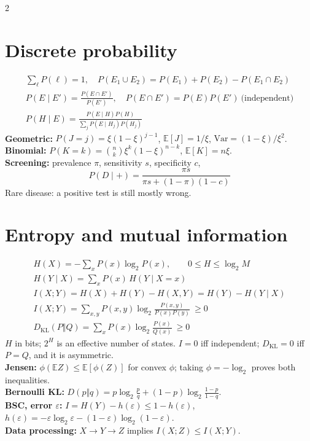 \documentclass[10pt,a4paper]{scrartcl}
\begin{document}
\begin{multicols}{2}
\section*{Discrete probability}
\begin{gather*}
\sum_\ell P(\ell)=1,\quad
P(E_1\cup E_2)=P(E_1)+P(E_2)-P(E_1\cap E_2)\\
P(E\mid E')=\frac{P(E\cap E')}{P(E')},\quad
P(E\cap E')=P(E)P(E')\ \text{(independent)}\\
P(H\mid E)=\frac{P(E\mid H)P(H)}{\sum_jP(E\mid H_j)P(H_j)}
\end{gather*}
\textbf{Geometric:} $P(J=j)=\xi(1-\xi)^{j-1}$, $\mathbb E[J]=1/\xi$, $\mathrm{Var}=(1-\xi)/\xi^2$.\\
\textbf{Binomial:} $P(K=k)=\binom nk\xi^k(1-\xi)^{n-k}$, $\mathbb E[K]=n\xi$.\\
\textbf{Screening:} prevalence $\pi$, sensitivity $s$, specificity $c$,
\begin{equation*}
P(D\mid+)=\frac{\pi s}{\pi s+(1-\pi)(1-c)}
\end{equation*}
Rare disease: a positive test is still mostly wrong.

\section*{Entropy and mutual information}
\begin{gather*}
H(X)=-\sum_xP(x)\log_2P(x),\qquad 0\le H\le\log_2M\\
H(Y\mid X)=\sum_xP(x)\,H(Y\mid X=x)\\
I(X;Y)=H(X)+H(Y)-H(X,Y)=H(Y)-H(Y\mid X)\\
I(X;Y)=\sum_{x,y}P(x,y)\log_2\frac{P(x,y)}{P(x)P(y)}\ \ge0\\
D_{\mathrm{KL}}(P\Vert Q)=\sum_xP(x)\log_2\frac{P(x)}{Q(x)}\ \ge0
\end{gather*}
$H$ in bits; $2^H$ is an effective number of states. $I=0$ iff independent; $D_{\mathrm{KL}}=0$ iff $P=Q$, and it is asymmetric.\\
\textbf{Jensen:} $\phi(\mathbb E Z)\le\mathbb E[\phi(Z)]$ for convex $\phi$; taking $\phi=-\log_2$ proves both inequalities.\\
\textbf{Bernoulli KL:} $D(p\Vert q)=p\log_2\frac pq+(1-p)\log_2\frac{1-p}{1-q}$.\\
\textbf{BSC, error $\varepsilon$:} $I=H(Y)-h(\varepsilon)\le1-h(\varepsilon)$, $h(\varepsilon)=-\varepsilon\log_2\varepsilon-(1-\varepsilon)\log_2(1-\varepsilon)$.\\
\textbf{Data processing:} $X\to Y\to Z$ implies $I(X;Z)\le I(X;Y)$.

\end{multicols}
\end{document}
